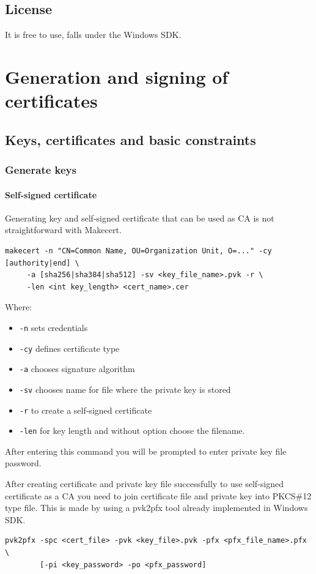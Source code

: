 \documentclass[10pt, a4paper]{report}
\begin{document}
{  \subsection{License}
It is free to use, falls under the Windows SDK.
  
\section{Generation and signing of certificates}

  \subsection{Keys, certificates and basic constraints}
  
    \subsubsection{Generate keys}

      \paragraph{Self-signed certificate}
Generating key and self-signed certificate that can be used as CA is not straightforward with Makecert.
\begin{verbatim}
makecert -n "CN=Common Name, OU=Organization Unit, O=..." -cy [authority|end] \
	 -a [sha256|sha384|sha512] -sv <key_file_name>.pvk -r \
	 -len <int key_length> <cert_name>.cer
\end{verbatim}

Where:
\begin{itemize}
\item \verb+-n+ sets credentials
\item \verb+-cy+ defines certificate type
\item \verb+-a+ chooses signature algorithm
\item \verb+-sv+ chooses name for file where the private key is stored
\item \verb+-r+ to create a self-signed certificate
\item \verb+-len+ for key length and without option choose the filename.
\end{itemize}

After entering this command you will be prompted to enter private key file password.

After creating certificate and private key file successfully to use self-signed certificate as a CA you need to join certificate file and private key into PKCS\#12 type file. This is made by using a pvk2pfx tool already implemented in Windows SDK.
\begin{verbatim}
pvk2pfx -spc <cert_file> -pvk <key_file>.pvk -pfx <pfx_file_name>.pfx \
        [-pi <key_password> -po <pfx_password]
\end{verbatim}

}
\end{document}
